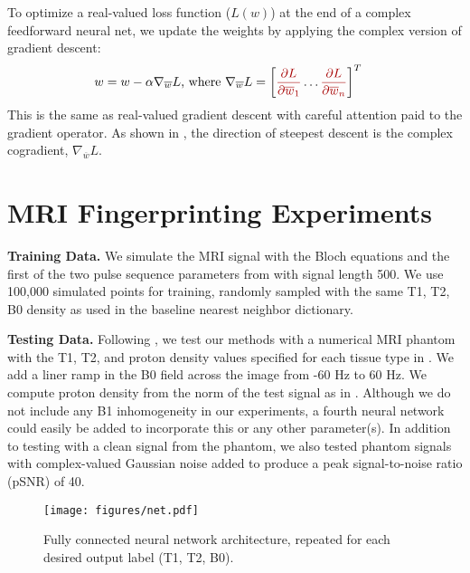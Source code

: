 \documentclass{article}
\newcommand*\conj[1]{\overline{#1}}
\begin{document}
To optimize a real-valued loss function ($L(w)$) at the end of a complex feedforward neural net,
we update the weights by applying the complex version of gradient descent:
\begin{align}
w &= w - \alpha \nabla_{\conj{w}}L
\text{, where } \nabla_{\conj{w}}L =
\bigg[{\color{red}\frac{\partial L}{\partial \conj{w}_1}} \hdots {\color{red}\frac{\partial L}{\partial \conj{w}_n}} \bigg] ^T
\end{align}
This is the same as real-valued gradient descent with careful attention paid to the gradient operator. As shown in \cite{brandwood}, the direction of steepest descent is the complex cogradient, $\nabla_{\conj{w}}L$.

\section{MRI Fingerprinting Experiments}
\label{sec:methods}

{\bf Training Data.} We simulate the MRI signal with the Bloch equations and the first of the two pulse sequence parameters from \cite{mrf_nature} with signal length 500. We use 100,000 simulated points for training, randomly sampled with the same T1, T2, B0 density as used in the baseline nearest neighbor dictionary.

{\bf Testing Data.} Following \cite{mrf_multiscale}, we test our methods with a numerical MRI phantom \cite{collins98,collins06} with the T1, T2, and proton density values specified for each tissue type in \cite{collins06}. We add a liner ramp in the B0 field across the image from -60 Hz to 60 Hz. We compute proton density from the norm of the test signal as in \cite{mrf_nature}. Although we do not include any B1 inhomogeneity in our experiments, a fourth neural network could easily be added to incorporate this or any other parameter(s).  In addition to testing with a clean signal from the phantom, we also tested phantom signals with complex-valued Gaussian noise added to produce a peak signal-to-noise ratio (pSNR) of 40.

\begin{figure}[bp]
\centering
	\texttt{[image: figures/net.pdf]}
	\caption{Fully connected neural network architecture, repeated for each desired output label (T1, T2, B0).}
	\label{fig:net}
\end{figure}
\end{document}
